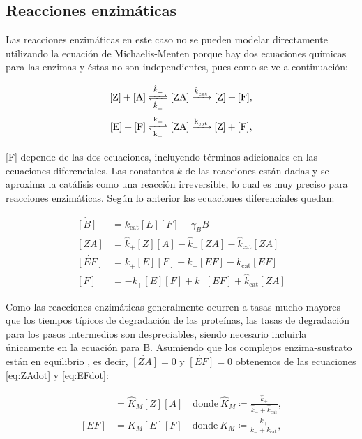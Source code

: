 \documentclass[12pt]{article}
\begin{document}
\subsection{Reacciones enzim\'aticas}

 Las reacciones enzim\'aticas en este caso no se pueden modelar directamente utilizando la ecuaci\'on de Michaelis-Menten porque hay dos ecuaciones qu\'imicas para las enzimas y \'estas no son independientes, pues como se ve a continuaci\'on:

\begin{align}
\ce{[Z] + [A]} &\ce{<=>[\ce{\hat{k}_+}][\ce{\hat{k}_-}] [ZA] ->[\ce{\hat{k}_{cat}}] [Z] + [F]}, \label{eq:echem1}\\
\ce{[E] + [F]} &\ce{<=>[\ce{k_+}][\ce{k_-}] [ZA] ->[\ce{k_{cat}}] [Z] + [F]}, \label{eq:echem2}
\end{align}

[F] depende de las dos ecuaciones, incluyendo t\'erminos adicionales en las ecuaciones diferenciales. Las constantes $k$ de las reacciones est\'an dadas y se aproxima la cat\'alisis  como una reacci\'on irreversible, lo cual es muy preciso para reacciones enzim\'aticas. Seg\'un lo anterior las ecuaciones diferenciales quedan:

\begin{align}
  \dot{[B]} &= k_{\text{cat}}[E][F]-\gamma_BB \label{eq:Bdot}\\
  \dot{[ZA]} &= \hat{k}_+[Z][A] - \hat{k}_-[ZA]-\hat{k}_{\text{cat}}[ZA] \label{eq:ZAdot}\\
  \dot{[EF]} &= k_+[E][F]-k_-[EF]-k_{\text{cat}}[EF] \label{eq:EFdot}\\
  \dot{[F]} &= -k_+[E][F]+k_-[EF]+\hat{k}_{\text{cat}}[ZA] \label{eq:Fdot}
\end{align}

Como las reacciones enzim\'aticas generalmente ocurren a tasas mucho mayores que los tiempos t\'ipicos de degradaci\'on de las prote\'inas, las tasas de degradaci\'on para los pasos intermedios son despreciables, siendo necesario incluirla \'unicamente en la ecuaci\'on para B. Asumiendo que los complejos enzima-sustrato est\'an en equilibrio , es decir, $\dot{[ZA]} = 0$ y $\dot{[EF]} = 0$ obtenemos de las ecuaciones \ref{eq:ZAdot} y \ref{eq:EFdot}:

\begin{align}
[ZA]&=\hat{K}_M[Z][A] \quad \text{donde} \: \hat{K}_M \coloneqq \frac{\hat{k}_+}{\hat{k}_-+\hat{k}_{\text{cat}}},\\
[EF]&=K_{M}[E][F] \quad \text{donde} \: K_M \coloneqq \frac{k_+}{k_-+k_{\text{cat}}},
\end{align}
\end{document}
